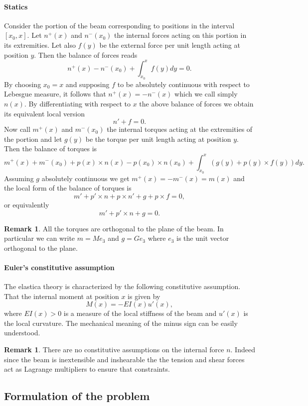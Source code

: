 \documentclass[a4paper,11pt]{article}
\theoremstyle{definition}
\newtheorem{rmk}[prop]{Remark}
\begin{document}
\paragraph{Statics} Consider the portion of the beam corresponding to positions in the interval $[x_0,x]$. Let $n^+(x)$ and $n^-(x_0)$ the internal forces acting on this portion in its extremities. Let also $f(y)$ be the external force per unit length acting at position $y$. Then the balance of forces reads
\[
n^+(x)-n^-(x_0)+\int_{x_0}^xf(y)dy=0.
\]
By choosing $x_0=x$ and supposing $f$ to be absolutely continuous with respect to Lebesgue measure, it follows that $n^+(x)=-n^-(x)$ which we call simply $n(x)$. By differentiating with respect to $x$ the above balance of forces we obtain its equivalent local version
\[
n'+f=0.
\]
Now call $m^+(x)$ and $m^-(x_0)$ the internal torques acting at the extremities of the portion and let $g(y)$ be the torque per unit length acting at position $y$. Then the balance of torques is
\[
m^+(x)+m^-(x_0)+p(x)\times n(x)-p(x_0)\times n(x_0)+\int_{x_0}^x\left(g(y)+p(y)\times f(y)\right)dy.
\]
Assuming $g$ absolutely continuous we get $m^+(x)=-m^-(x)=m(x)$ and the local form of the balance of torques is
\[
m'+p'\times n+p\times n'+g+p\times f=0,
\]
or equivalently
\[
m'+p'\times n+g=0.
\]
\begin{rmk}
All the torques are orthogonal to the plane of the beam. In particular we can write $m=Me_3$ and $g=Ge_3$ where $e_3$ is the unit vector orthogonal to the plane. 
\end{rmk}

\paragraph{Euler's constitutive assumption} The elastica theory is characterized by the following constitutive assumption. That the internal moment at position $x$ is given by
\[
M(x)=-EI(x)u'(x),
\]
where $EI(x)>0$ is a measure of the local stiffness of the beam and $u'(x)$ is the local curvature. The mechanical meaning of the minus sign can be easily understood.
\begin{rmk}
There are no constitutive assumptions on the internal force $n$. Indeed since the beam is inextensible and inshearable the the tension and shear forces act as Lagrange multipliers to ensure that constraints.
\end{rmk}

\subsection{Formulation of the problem}
\end{document}
